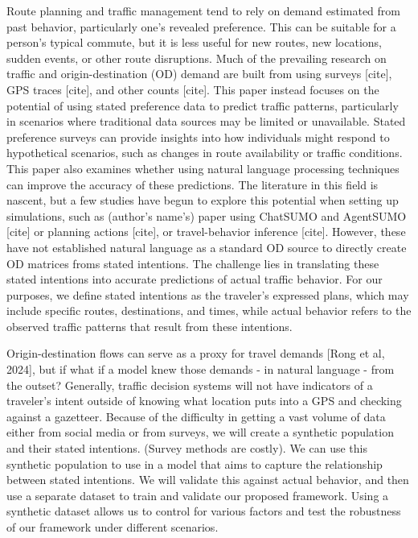 \documentclass[11pt,letterpaper]{article}
\begin{document}
Route planning and traffic management tend to rely on demand estimated from past behavior, particularly one's revealed preference. 
This can be suitable for a person's typical commute, but it is less useful for new routes, new locations, sudden events, or other route disruptions. 
Much of the prevailing research on traffic and origin-destination (OD) demand are built from using surveys [cite], GPS traces [cite], and other counts [cite]. 
This paper instead focuses on the potential of using stated preference data to predict traffic patterns, particularly in scenarios where traditional 
data sources may be limited or unavailable. Stated preference surveys can provide insights into how individuals might respond to hypothetical scenarios, 
such as changes in route availability or traffic conditions. This paper also examines whether using natural language processing techniques can improve the 
accuracy of these predictions. The literature in this field is nascent, but a few studies have begun to explore this potential when setting up simulations, 
such as (author's name's) paper using ChatSUMO and AgentSUMO [cite] or planning actions [cite], or travel-behavior inference [cite]. 
However, these have not established natural language as a standard OD source to directly create OD matrices froms stated intentions. 
The challenge lies in translating these stated intentions into accurate predictions of actual traffic behavior. For our purposes, we 
define stated intentions as the traveler's expressed plans, which may include specific routes, destinations, and times, while actual behavior 
refers to the observed traffic patterns that result from these intentions.  

Origin-destination flows can serve as a proxy for travel demands [Rong et al, 2024], but if what if a model knew those demands - in natural language - 
from the outset? Generally, traffic decision systems will not have indicators of a traveler's intent outside of knowing what location puts into a GPS
and checking against a gazetteer. Because of the difficulty in getting a vast volume of data either from social media or from surveys, we will create
a synthetic population and their stated intentions. (Survey methods are costly). We can use this synthetic population to use in a model that aims to capture the relationship 
between stated intentions. We will validate this against actual behavior, and then use a separate dataset to train and validate our proposed framework. 
Using a synthetic dataset allows us to control for various factors and test the robustness of our framework under different scenarios. 
\end{document}
